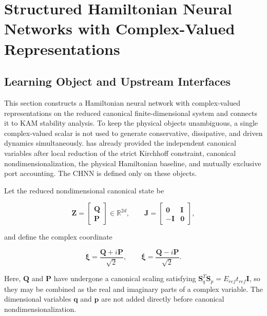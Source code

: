 \section{Structured Hamiltonian Neural Networks with Complex-Valued Representations}\label{sec:chnn-model}

\subsection{Learning Object and Upstream Interfaces}\label{sec:chnn-4-1}

This section constructs a Hamiltonian neural network with complex-valued representations on the reduced canonical finite-dimensional system and connects it to KAM stability analysis. To keep the physical objects unambiguous, a single complex-valued scalar is not used to generate conservative, dissipative, and driven dynamics simultaneously.  has already provided the independent canonical variables after local reduction of the strict Kirchhoff constraint, canonical nondimensionalization, the physical Hamiltonian baseline, and mutually exclusive port accounting. The CHNN is defined only on these objects.

Let the reduced nondimensional canonical state be

\begin{equation}
\label{eq:chnn-4-1}
\mathbf{Z} = \begin{bmatrix}
\mathbf{Q} \\
\mathbf{P}
\end{bmatrix} \in \mathbb{R}^{2d},\quad\quad\mathbf{J} = \begin{bmatrix}
\mathbf{0} & \mathbf{I} \\
 - \mathbf{I} & \mathbf{0}
\end{bmatrix},
\end{equation}

and define the complex coordinate

\begin{equation}
\label{eq:chnn-4-2}
\boxed{\bm{\xi} = \frac{\mathbf{Q} + i\mathbf{P}}{\sqrt{2}},\quad\quad\overline{\bm{\xi}} = \frac{\mathbf{Q} - i\mathbf{P}}{\sqrt{2}}.}
\end{equation}

Here, \(\mathbf{Q}\) and \(\mathbf{P}\) have undergone a canonical scaling satisfying \(\mathbf{S}_{q}^{T}\mathbf{S}_{p}=E_{ref}t_{ref}\mathbf{I}\), so they may be combined as the real and imaginary parts of a complex variable. The dimensional variables \(\mathbf{q}\) and \(\mathbf{p}\) are not added directly before canonical nondimensionalization.

